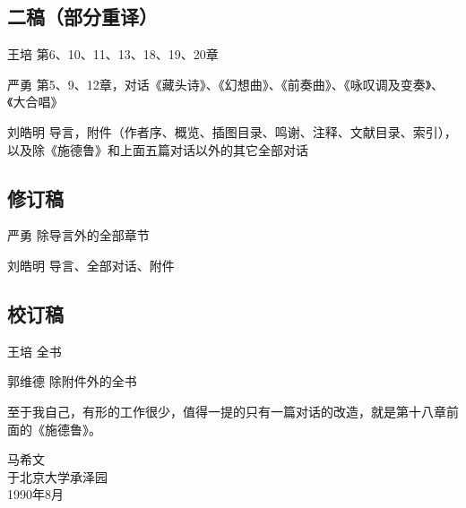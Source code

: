 \subsection*{二稿（部分重译）}

\begin{authorlist}
\item[王培]第6、10、11、13、18、19、20章
\item[严勇]第5、9、12章，对话《藏头诗》、《幻想曲》、《前奏曲》、《咏叹调及变奏》、《大合唱》
\item[刘皓明]导言，附件（作者序、概览、插图目录、鸣谢、注释、文献目录、索引），以及除《施德鲁》和上面五篇对话以外的其它全部对话
\end{authorlist}

\subsection*{修订稿}

\begin{authorlist}
\item[严勇]除导言外的全部章节
\item[刘皓明]导言、全部对话、附件
\end{authorlist}

\subsection*{校订稿}

\begin{authorlist}
\item[王培]全书
\item[郭维德]除附件外的全书
\end{authorlist}

至于我自己，有形的工作很少，值得一提的只有一篇对话的改造，就是第十八章前面的《施德鲁》。

\begin{signature}
马希文\\
于北京大学承泽园\\
1990年8月\\
\end{signature}
